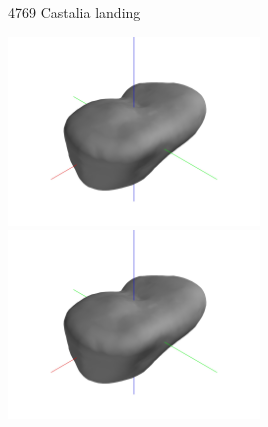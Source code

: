 \begin{frame}{4769 Castalia landing}

\begin{center}
    \href{https://youtu.be/57sGEJRwfH4}{\includegraphics[trim={20cm 10cm 20cm 10cm},clip,keepaspectratio,width=0.5\textwidth,height=\textheight]{figures/computational_geometry/dynamic_exploration/castalia/partial_14998.jpg}}%
    \href{https://youtu.be/8igpoKcwqXs}{\includegraphics[trim={20cm 10cm 20cm 10cm},clip,keepaspectratio,width=0.5\textwidth,height=\textheight]{figures/computational_geometry/dynamic_exploration/castalia/partial_14998.jpg}}
\end{center}

\end{frame}
